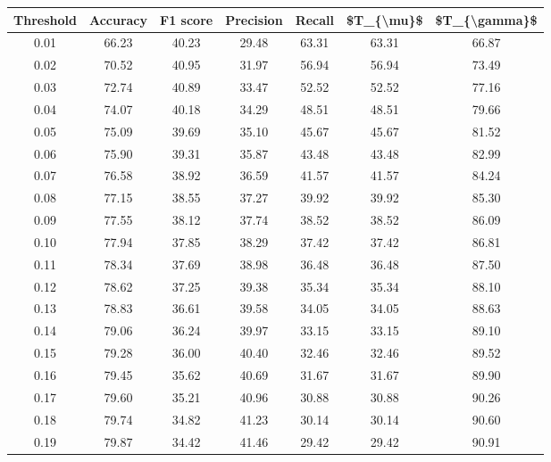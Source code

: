 \begin{tabular}{|c|c|c|c|c|c|c|}
\hline
 Threshold &  Accuracy &  F1 score &  Precision &  Recall &  \$T\_\{\textbackslash mu\}\$ &  \$T\_\{\textbackslash gamma\}\$ \\
\hline
      0.01 &     66.23 &     40.23 &      29.48 &   63.31 &      63.31 &         66.87 \\
      0.02 &     70.52 &     40.95 &      31.97 &   56.94 &      56.94 &         73.49 \\
      0.03 &     72.74 &     40.89 &      33.47 &   52.52 &      52.52 &         77.16 \\
      0.04 &     74.07 &     40.18 &      34.29 &   48.51 &      48.51 &         79.66 \\
      0.05 &     75.09 &     39.69 &      35.10 &   45.67 &      45.67 &         81.52 \\
      0.06 &     75.90 &     39.31 &      35.87 &   43.48 &      43.48 &         82.99 \\
      0.07 &     76.58 &     38.92 &      36.59 &   41.57 &      41.57 &         84.24 \\
      0.08 &     77.15 &     38.55 &      37.27 &   39.92 &      39.92 &         85.30 \\
      0.09 &     77.55 &     38.12 &      37.74 &   38.52 &      38.52 &         86.09 \\
      0.10 &     77.94 &     37.85 &      38.29 &   37.42 &      37.42 &         86.81 \\
      0.11 &     78.34 &     37.69 &      38.98 &   36.48 &      36.48 &         87.50 \\
      0.12 &     78.62 &     37.25 &      39.38 &   35.34 &      35.34 &         88.10 \\
      0.13 &     78.83 &     36.61 &      39.58 &   34.05 &      34.05 &         88.63 \\
      0.14 &     79.06 &     36.24 &      39.97 &   33.15 &      33.15 &         89.10 \\
      0.15 &     79.28 &     36.00 &      40.40 &   32.46 &      32.46 &         89.52 \\
      0.16 &     79.45 &     35.62 &      40.69 &   31.67 &      31.67 &         89.90 \\
      0.17 &     79.60 &     35.21 &      40.96 &   30.88 &      30.88 &         90.26 \\
      0.18 &     79.74 &     34.82 &      41.23 &   30.14 &      30.14 &         90.60 \\
      0.19 &     79.87 &     34.42 &      41.46 &   29.42 &      29.42 &         90.91 \\

\end{tabular}
